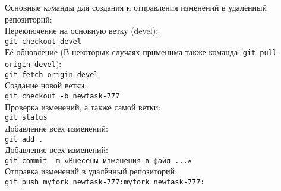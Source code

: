 Основные команды для создания и отправления изменений в удалённый репозиторий:
\\Переключение на основную ветку (devel):
\\ \texttt{git checkout devel}
\\ \quad Её обновление (В некоторых случаях применима также команда: \texttt{git pull origin devel}):
\\ \texttt{git fetch origin devel}
\\ \quad Создание новой ветки:
\\ \texttt{git checkout -b newtask-777}
\\ \quad Проверка изменений, а также самой ветки:
\\ \texttt{git status}
\\ \quad Добавление всех изменений:
\\ \texttt{git add .}
\\ \quad Добавление всех изменений:
\\ \texttt{git commit -m «Внесены изменения в файл ...»}
\\ \quad Отправка изменений в удалённый репозиторий:
\\ \texttt{git push myfork newtask-777:myfork newtask-777:}